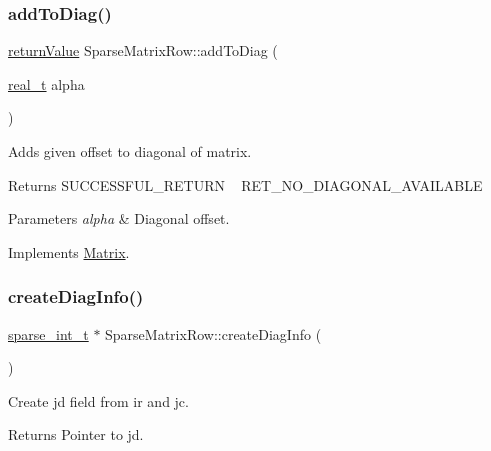 \subsubsection{\texorpdfstring{add\+To\+Diag()}{addToDiag()}}
{\footnotesize\ttfamily \hyperlink{_message_handling_8hpp_a81d556f613bfbabd0b1f9488c0fa865e}{return\+Value} Sparse\+Matrix\+Row\+::add\+To\+Diag (\begin{DoxyParamCaption}\item[{\hyperlink{qp_o_a_s_e_s__wrapper_8h_a0d00e2b3dfadee81331bbb39068570c4}{real\+\_\+t}}]{alpha }\end{DoxyParamCaption})\hspace{0.3cm}{\ttfamily [virtual]}}

Adds given offset to diagonal of matrix. \begin{DoxyReturn}{Returns}
S\+U\+C\+C\+E\+S\+S\+F\+U\+L\+\_\+\+R\+E\+T\+U\+RN ~\newline
 R\+E\+T\+\_\+\+N\+O\+\_\+\+D\+I\+A\+G\+O\+N\+A\+L\+\_\+\+A\+V\+A\+I\+L\+A\+B\+LE 
\end{DoxyReturn}

\begin{DoxyParams}{Parameters}
{\em alpha} & Diagonal offset. \\
\hline
\end{DoxyParams}


Implements \hyperlink{class_matrix_a7ee8d1b4ef0d5d5fb34342ea1889382f}{Matrix}.

\mbox{\label{class_sparse_matrix_row_a3e72a351698454ba063f3b0814f919c8}} 
\subsubsection{\texorpdfstring{create\+Diag\+Info()}{createDiagInfo()}}
{\footnotesize\ttfamily \hyperlink{_types_8hpp_aa5432b00c9081e2d62d7f38c32e4ed80}{sparse\+\_\+int\+\_\+t} $\ast$ Sparse\+Matrix\+Row\+::create\+Diag\+Info (\begin{DoxyParamCaption}{ }\end{DoxyParamCaption})}

Create jd field from ir and jc. \begin{DoxyReturn}{Returns}
Pointer to jd. 
\end{DoxyReturn}
\mbox{\label{class_sparse_matrix_row_a1a7b95bc5e229f7f295ddbe95f57f67f}} 
